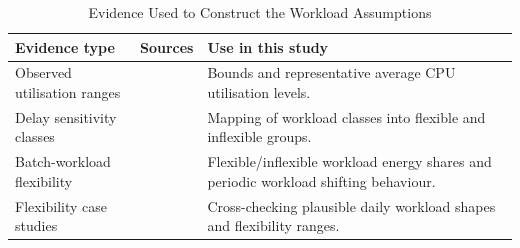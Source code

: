 \documentclass[lettersize,journal]{IEEEtran}
\newcommand{\rev}[1]{\textcolor{blue!70!black}{#1}}
\begin{document}
\begin{table}[!t]
\centering
\caption{\rev{Evidence Used to Construct the Workload Assumptions}}
\label{tab:workload-source-summary}
\begin{scriptsize}
\begin{tabular}{p{}p{}p{}}
\toprule
\textbf{Evidence type} & \textbf{Sources} & \textbf{Use in this study} \\
\midrule
Observed utilisation ranges & \cite{Zaloumis2022IBM,Ghia2011McKinsey} & Bounds and representative average CPU utilisation levels. \\
Delay sensitivity classes & \cite{6779441} & Mapping of workload classes into flexible and inflexible groups. \\
Batch-workload flexibility & \cite{Cao2022ApEn} & Flexible/inflexible workload energy shares and periodic workload shifting behaviour. \\
Flexibility case studies & \cite{Misaghian2023TIA,Xu2023SPIE,Zhou2024IJEPES,Fu2020ApEn,Liu2012PER} & Cross-checking plausible daily workload shapes and flexibility ranges. \\
\bottomrule
\end{tabular}
\end{scriptsize}
\end{table}
\end{document}
